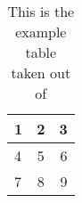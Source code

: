 \documentclass{article}
\begin{document}
\begin{table}
\caption{This is the example table taken out of }
\begin{center}
\begin{tabular}{| l |  c  | r |}
  1 & 2 & 3 \\ \hline
  4 & 5 & 6 \\ \hline
  7 & 8 & 9 \\ \hline
\end{tabular}
\end{center}
\end{table}
\end{document}
